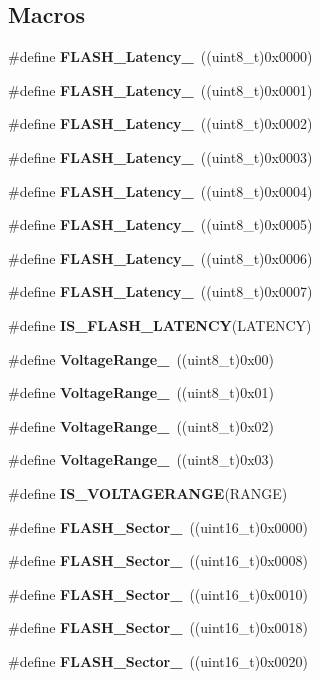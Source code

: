 \subsection*{Macros}
\begin{DoxyCompactItemize}
\item 
\#define \textbf{ F\+L\+A\+S\+H\+\_\+\+Latency\+\_}~((uint8\+\_\+t)0x0000)
\item 
\#define \textbf{ F\+L\+A\+S\+H\+\_\+\+Latency\+\_}~((uint8\+\_\+t)0x0001)
\item 
\#define \textbf{ F\+L\+A\+S\+H\+\_\+\+Latency\+\_}~((uint8\+\_\+t)0x0002)
\item 
\#define \textbf{ F\+L\+A\+S\+H\+\_\+\+Latency\+\_}~((uint8\+\_\+t)0x0003)
\item 
\#define \textbf{ F\+L\+A\+S\+H\+\_\+\+Latency\+\_}~((uint8\+\_\+t)0x0004)
\item 
\#define \textbf{ F\+L\+A\+S\+H\+\_\+\+Latency\+\_}~((uint8\+\_\+t)0x0005)
\item 
\#define \textbf{ F\+L\+A\+S\+H\+\_\+\+Latency\+\_}~((uint8\+\_\+t)0x0006)
\item 
\#define \textbf{ F\+L\+A\+S\+H\+\_\+\+Latency\+\_}~((uint8\+\_\+t)0x0007)
\item 
\#define \textbf{ I\+S\+\_\+\+F\+L\+A\+S\+H\+\_\+\+L\+A\+T\+E\+N\+CY}(L\+A\+T\+E\+N\+CY)
\item 
\#define \textbf{ Voltage\+Range\+\_}~((uint8\+\_\+t)0x00)
\item 
\#define \textbf{ Voltage\+Range\+\_}~((uint8\+\_\+t)0x01)
\item 
\#define \textbf{ Voltage\+Range\+\_}~((uint8\+\_\+t)0x02)
\item 
\#define \textbf{ Voltage\+Range\+\_}~((uint8\+\_\+t)0x03)
\item 
\#define \textbf{ I\+S\+\_\+\+V\+O\+L\+T\+A\+G\+E\+R\+A\+N\+GE}(R\+A\+N\+GE)
\item 
\#define \textbf{ F\+L\+A\+S\+H\+\_\+\+Sector\+\_}~((uint16\+\_\+t)0x0000)
\item 
\#define \textbf{ F\+L\+A\+S\+H\+\_\+\+Sector\+\_}~((uint16\+\_\+t)0x0008)
\item 
\#define \textbf{ F\+L\+A\+S\+H\+\_\+\+Sector\+\_}~((uint16\+\_\+t)0x0010)
\item 
\#define \textbf{ F\+L\+A\+S\+H\+\_\+\+Sector\+\_}~((uint16\+\_\+t)0x0018)
\item 
\#define \textbf{ F\+L\+A\+S\+H\+\_\+\+Sector\+\_}~((uint16\+\_\+t)0x0020)
\item 

\end{DoxyCompactItemize}
